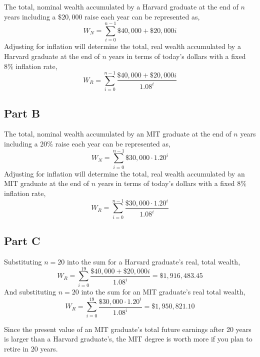 \documentclass{article}
\begin{document}
The total, nominal wealth accumulated by a Harvard graduate at the end of $n$
years including a $\$20,000$ raise each year can be represented as,
$$ W_N = \sum\limits_{i = 0}^{n - 1} \$40,000 + \$20,000 i $$
Adjusting for inflation will determine the total, real wealth accumulated by a
Harvard graduate at the end of $n$ years in terms of today's dollars with a
fixed $8\%$ inflation rate,
$$ W_R = \sum\limits_{i = 0}^{n - 1} \frac{\$40,000 + \$20,000 i}{1.08^i} $$

\break

\subsection*{Part B}

The total, nominal wealth accumulated by an MIT graduate at the end of  $n$
years including a $20\%$ raise each year can be represented as,
$$ W_N = \sum\limits_{i = 0}^{n - 1} \$30,000 \cdot 1.20^i $$
Adjusting for inflation will determine the total, real wealth accumulated by an
MIT graduate at the end of $n$ years in terms of today's dollars with a fixed
$8\%$ inflation rate,
$$ W_R = \sum\limits_{i = 0}^{n - 1} \frac{\$30,000 \cdot 1.20^i}{1.08^i} $$

\break

\subsection*{Part C}

Substituting $n = 20$ into the sum for a Harvard graduate's real, total wealth,
$$ W_R = \sum\limits_{i = 0}^{19} \frac{\$40,000 + \$20,000 i}{1.08^i} =
\$1,916,483.45 $$
And substituting $n = 20$ into the sum for an MIT graduate's real total wealth,
$$ W_R = \sum\limits_{i = 0}^{19} \frac{\$30,000 \cdot 1.20^i}{1.08^i} =
\$1,950,821.10 $$

Since the present value of an MIT graduate's total future earnings after 20
years is larger than a Harvard graduate's, the MIT degree is worth more if you
plan to retire in 20 years.
\end{document}
